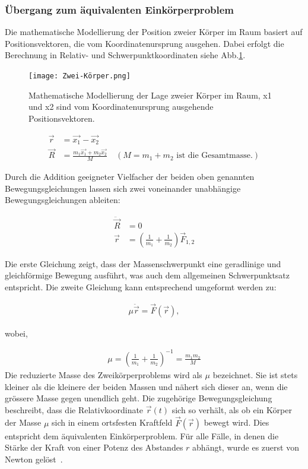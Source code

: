 \documentclass[a4paper,12pt,twoside]{article}
\begin{document}
\subsubsection{Übergang zum äquivalenten Einkörperproblem}
Die mathematische Modellierung der Position zweier Körper im Raum basiert auf Positionsvektoren, die vom Koordinatenursprung ausgehen. Dabei erfolgt die Berechnung in Relativ- und Schwerpunktkoordinaten siehe Abb.\ref{Zwei-Körper}.

\begin{figure}[H]
	\centering
	\texttt{[image: Zwei-Körper.png]}
	\caption[Eintrag in Abbildungsverzeichnis von der Mathematische Modellierung der Zwei Körper]{Mathematische Modellierung der Lage zweier Körper im Raum, x1 und x2 sind vom Koordinatenursprung ausgehende Positionsvektoren.}
	\label{Zwei-Körper}
\end{figure}

\begin{align*}
	\vec{r} &= \vec{x_1} - \vec{x_2} \\
	\vec{R} &= \frac{m_1 \vec{x_1} + m_2 \vec{x_2}}{M} \quad (M = m_1 + m_2 \text{ ist die Gesamtmasse.})
\end{align*}

Durch die Addition geeigneter Vielfacher der beiden oben genannten Bewegungsgleichungen lassen sich zwei voneinander unabhängige Bewegungsgleichungen ableiten:

\begin{align*}
	\ddot{\vec{R}} &= 0 \\
	\vec{r} &= \left( \frac{1}{m_1} + \frac{1}{m_2} \right) \vec{F}_{1,2}
\end{align*}

Die erste Gleichung zeigt, dass der Massenschwerpunkt eine geradlinige und gleichförmige Bewegung ausführt, was auch dem allgemeinen Schwerpunktsatz entspricht. Die zweite Gleichung kann entsprechend umgeformt werden zu:

\begin{align*}
\mu \ddot{\vec{r}} = \vec{F}(\vec{r}),
\end{align*}

wobei,

\begin{align*}
\mu = \left( \frac{1}{m_1} + \frac{1}{m_2} \right)^{-1} = \frac{m_1 m_2}{M}
\end{align*}
Die reduzierte Masse des Zweikörperproblems wird als $\mu$ bezeichnet. Sie ist stets kleiner als die kleinere der beiden Massen und nähert sich dieser an, wenn die grössere Masse gegen unendlich geht. Die zugehörige Bewegungsgleichung beschreibt, dass die Relativkoordinate $\vec{r}(t)$ sich so verhält, als ob ein Körper der Masse $\mu$ sich in einem ortsfesten Kraftfeld $\vec{F}(\vec{r})$ bewegt wird. Dies entspricht dem äquivalenten Einkörperproblem. Für alle Fälle, in denen die Stärke der Kraft von einer Potenz des Abstandes $r$ abhängt, wurde es zuerst von Newton gelöst~\cite{Gleisner2013}.
\end{document}

